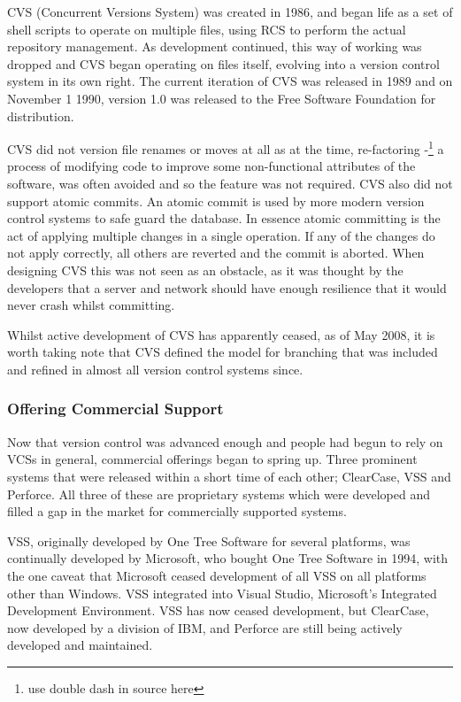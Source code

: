 CVS (Concurrent Versions System) was created in 1986, and began life as a set of shell scripts to operate on multiple files, using RCS to perform the actual repository management.
As development continued, this way of working was dropped and CVS began operating on files itself, evolving into a version control system in its own right.
The current iteration of CVS was released in 1989 and on November 1 1990, version 1.0 was released to the Free Software Foundation for distribution.

CVS did not version file renames or moves at all as at the time, re-factoring -\footnote{use double dash in source here} a process of modifying code to improve some non-functional attributes of the software, was often avoided and so the feature was not required.
CVS also did not support atomic commits.
An atomic commit is used by more modern version control systems to safe guard the database.
In essence atomic committing is the act of applying multiple changes in a single operation.
If any of the changes do not apply correctly, all others are reverted and the commit is aborted.
When designing CVS this was not seen as an obstacle, as it was thought by the developers that a server and network should have enough resilience that it would never crash whilst committing.

Whilst active development of CVS has apparently ceased, as of May 2008, it is worth taking note that CVS defined the model for branching that was included and refined in almost all version control systems since.

\subsubsection{Offering Commercial Support}
Now that version control was advanced enough and people had begun to rely on VCSs in general, commercial offerings began to spring up.
Three prominent systems that were released within a short time of each other; ClearCase, VSS and Perforce.
All three of these are proprietary systems which were developed and filled a gap in the market for commercially supported systems.

VSS, originally developed by One Tree Software for several platforms, was continually developed by Microsoft, who bought One Tree Software in 1994, with the one caveat that Microsoft ceased development of all VSS on all platforms other than Windows.
VSS integrated into Visual Studio, Microsoft's Integrated Development Environment.
VSS has now ceased development, but ClearCase, now developed by a division of IBM, and Perforce are still being actively developed and maintained.

